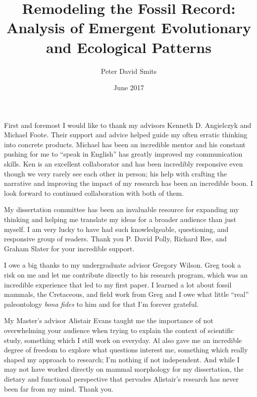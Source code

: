 \documentclass{ucetd}  %
\title{Remodeling the Fossil Record: \protect\\Analysis of Emergent Evolutionary and Ecological Patterns}
\author{Peter David Smits}
\date{June 2017}
\begin{document}
\maketitle

\makecopyright
\makededication


\tableofcontents
\listoffigures
\listoftables

\acknowledgments
First and foremost I would like to thank my advisors Kenneth D. Angielczyk and Michael Foote. Their support and advice helped guide my often erratic thinking into concrete products. Michael has been an incredible mentor and his constant pushing for me to ``speak in English'' has greatly improved my communication skills. Ken is an excellent collaborator and has been incredibly responsive even though we very rarely see each other in person; his help with crafting the narrative and improving the impact of my research has been an incredible boon. I look forward to continued collaboration with both of them.

My dissertation committee has been an invaluable resource for expanding my thinking and helping me translate my ideas for a broader audience than just myself. I am very lucky to have had such knowledgeable, questioning, and responsive group of readers. Thank you P. David Polly, Richard Ree, and Graham Slater for your incredible support. 

I owe a big thanks to my undergraduate advisor Gregory Wilson. Greg took a risk on me and let me contribute directly to his research program, which was an incredible experience that led to my first paper. I learned a lot about fossil mammals, the Cretaceous, and field work from Greg and I owe what little ``real'' paleontology \textit{bona fides} to him and for that I'm forever grateful. 

My Master's advisor Alistair Evans taught me the importance of not overwhelming your audience when trying to explain the context of scientific study, something which I still work on everyday. Al also gave me an incredible degree of freedom to explore what questions interest me, something which really shaped my approach to research; I'm nothing if not independent. And while I may not have worked directly on mammal morphology for my dissertation, the dietary and functional perspective that pervades Alistair's research has never been far from my mind. Thank you.
\end{document}
